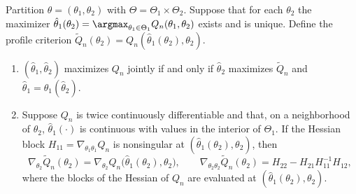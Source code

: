 \begin{proposition}\label{prop:A-profile}
Partition $\theta = (\theta_1, \theta_2)$ with $\Theta = \Theta_1 \times \Theta_2$. Suppose that for each $\theta_2$ the
maximizer $\hat\theta_1(\theta_2) = \argmax_{\theta_1 \in \Theta_1}Q_n(\theta_1, \theta_2)$ exists and is unique. Define the
profile criterion $\tilde Q_n(\theta_2) = Q_n(\hat\theta_1(\theta_2), \theta_2)$.
\begin{enumerate}[label=(\alph*)]
  \item $(\hat\theta_1, \hat\theta_2)$ maximizes $Q_n$ jointly if and only if $\hat\theta_2$ maximizes $\tilde Q_n$ and
  $\hat\theta_1 = \hat\theta_1(\hat\theta_2)$.
  \item Suppose $Q_n$ is twice continuously differentiable and that, on a neighborhood of $\theta_2$, $\hat\theta_1(\cdot)$ is
  continuous with values in the interior of $\Theta_1$. If the Hessian block $H_{11} = \nabla_{\theta_1\theta_1}Q_n$ is
  nonsingular at $(\hat\theta_1(\theta_2), \theta_2)$, then
  \begin{equation}\label{eq:A-profile-derivs}
    \nabla_{\theta_2}\tilde Q_n(\theta_2) = \nabla_{\theta_2}Q_n\big(\hat\theta_1(\theta_2), \theta_2\big),
    \qquad
    \nabla_{\theta_2\theta_2}\tilde Q_n(\theta_2) = H_{22} - H_{21}H_{11}^{-1}H_{12},
  \end{equation}
  where the blocks of the Hessian of $Q_n$ are evaluated at $(\hat\theta_1(\theta_2), \theta_2)$.
\end{enumerate}
\end{proposition}

